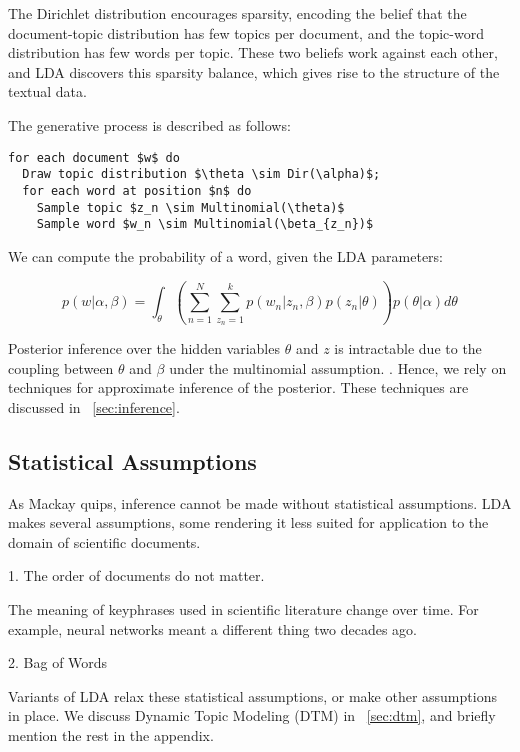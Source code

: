 \documentclass[letterpaper]{article}
\begin{document}
The Dirichlet distribution encourages sparsity, encoding the belief
that the document-topic distribution has few topics per document, and
the topic-word distribution has few words per topic. These two beliefs
work against each other, and LDA discovers this sparsity balance,
which gives rise to the structure of the textual data.

The generative process is described as follows:

\begin{lstlisting}[mathescape=true]
for each document $w$ do
  Draw topic distribution $\theta \sim Dir(\alpha)$;
  for each word at position $n$ do
    Sample topic $z_n \sim Multinomial(\theta)$
    Sample word $w_n \sim Multinomial(\beta_{z_n})$
\end{lstlisting}

We can compute the probability of a word, given the LDA parameters:

\begin{equation}
  p(w | \alpha, \beta) = \int_\theta \left( \sum_{n=1}^{N}
    \sum_{z_n = 1}^{k} p(w_n | z_n, \beta)p(z_n | \theta) \right)
  p(\theta | \alpha) d\theta
\end{equation}

Posterior inference over the hidden variables $\theta$ and $z$ is
intractable due to the coupling between $\theta$ and $\beta$ under the
multinomial assumption. \citep{blei2003latent}. Hence, we rely on
techniques for approximate inference of the posterior. These
techniques are discussed in ~\autoref{sec:inference}.

\subsection{Statistical Assumptions}
\label{subsec:statistical-assumptions}
As Mackay quips, inference cannot be made without statistical
assumptions. LDA makes several assumptions, some rendering it less
suited for application to the domain of scientific documents.

1. The order of documents do not matter.

The meaning of keyphrases used in scientific literature change over
time. For example, neural networks meant a different thing two decades
ago.

2. Bag of Words

Variants of LDA relax these statistical assumptions, or make other
assumptions in place. We discuss Dynamic Topic Modeling (DTM) in
~\autoref{sec:dtm}, and briefly mention the rest in the appendix.
\end{document}
